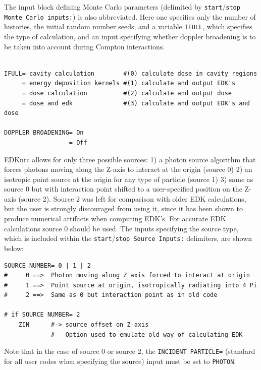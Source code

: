 \documentclass[12pt,twoside]{article}  %
\begin{document}
The input block defining Monte Carlo parameters (delimited by
{\tt start}/{\tt stop Monte Carlo inputs:}) is also abbreviated.  Here
one specifies only the number of histories, the initial random number
seeds, and a variable {\tt IFULL}, which specifies the type of calculation,
and an input specifying whether doppler broadening is to be taken into
account during Compton interactions.

\begin{verbatim}

IFULL= cavity calculation        #(0) calculate dose in cavity regions
     = energy deposition kernels #(1) calculate and output EDK's
     = dose calculation          #(2) calculate and output dose
     = dose and edk              #(3) calculate and output EDK's and dose

DOPPLER BROADENING= On
                  = Off

\end{verbatim}

EDKnrc allows for only three possible sources: 1) a photon source algorithm
that forces photons moving along the Z-axis to interact at the origin
(source 0) 2)
an isotropic point source at the origin for any type of
particle (source 1) 3) same as source 0 but with interaction point shifted
to a user-specified position on the Z-axis (source 2).  Source 2
was left for comparison with older EDK calculations, but the user
is strongly discouraged from using it, since it has been shown to produce
numerical artifacts when computing EDK's. For accurate EDK calculations
source 0 should be used.   The inputs specifying the source type, which is
included within the {\tt start}/{\tt stop Source Inputs:} delimiters,
are shown below:

\begin{verbatim}
SOURCE NUMBER= 0 | 1 | 2
#     0 ==>  Photon moving along Z axis forced to interact at origin
#     1 ==>  Point source at origin, isotropically radiating into 4 Pi
#     2 ==>  Same as 0 but interaction point as in old code

# if SOURCE NUMBER= 2
    ZIN      #-> source offset on Z-axis
             #   Option used to emulate old way of calculating EDK
\end{verbatim}

Note that in the case of source 0 or source 2, the {\tt INCIDENT PARTICLE=}
(standard for all user codes when specifying the source) input must be
set to {\tt PHOTON}.
\end{document}
